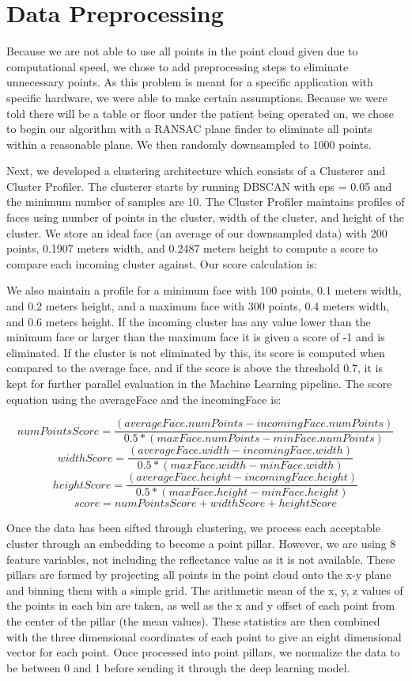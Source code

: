 \documentclass{article}
\begin{document}
\section{Data Preprocessing}
Because we are not able to use all points in the point cloud given due to computational speed, we chose to add preprocessing steps to eliminate unnecessary points. As this problem is meant for a specific application with specific hardware, we were able to make certain assumptions. Because we were told there will be a table or floor under the patient being operated on, we chose to begin our algorithm with a RANSAC plane finder to eliminate all points within a reasonable plane. We then randomly downsampled to 1000 points. 

Next, we developed a clustering architecture which consists of a Clusterer and Cluster Profiler. The clusterer starts by running DBSCAN with eps = 0.05 and the minimum number of samples are 10. The Cluster Profiler maintains profiles of faces using number of points in the cluster, width of the cluster, and height of the cluster. We store an ideal face (an average of our downsampled data) with 200 points, 0.1907 meters width, and 0.2487 meters height to compute a score to compare each incoming cluster against. Our score calculation is:

We also maintain a profile for a minimum face with 100 points, 0.1 meters width, and 0.2 meters height, and a maximum face with 300 points, 0.4 meters width, and 0.6 meters height. If the incoming cluster has any value lower than the minimum face or larger than the maximum face it is given a score of -1 and is eliminated. If the cluster is not eliminated by this, its score is computed when compared to the average face, and if the score is above the threshold 0.7, it is kept for further parallel evaluation in the Machine Learning pipeline. The score equation using the averageFace and the incomingFace is:

\[
    numPointsScore= \frac{(averageFace.numPoints - incomingFace.numPoints)}{0.5 * (maxFace.numPoints - minFace.numPoints)}
\]
\[
    widthScore= \frac{(averageFace.width - incomingFace.width)}{0.5 * (maxFace.width - minFace.width)}
\]
\[
    heightScore= \frac{(averageFace.height - incomingFace.height)}{0.5 * (maxFace.height - minFace.height)}
\]
\[
    score = numPointsScore + widthScore + heightScore
\]

Once the data has been sifted through clustering, we process each acceptable cluster through an embedding to become a point pillar\cite{pointpillars}. However, we are using 8 feature variables, not including the reflectance value as it is not available. These pillars are formed by projecting all points in the point cloud onto the x-y plane and binning them with a simple grid. The arithmetic mean of the x, y, z values of the points in each bin are taken, as well as the x and y offset of each point from the center of the pillar (the mean values). These statistics are then combined with the three dimensional coordinates of each point to give an eight dimensional vector for each point. Once processed into point pillars, we normalize the data to be between 0 and 1 before sending it through the deep learning model. 
\end{document}
